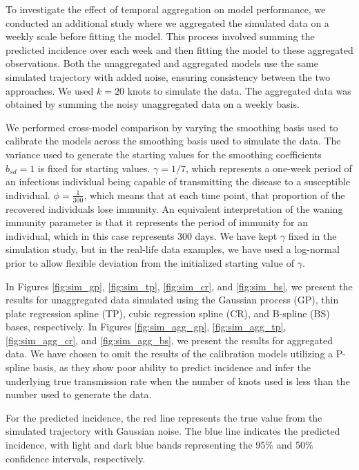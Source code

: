 \documentclass[
11pt, %
oneside, %
english, %
singlespacing, %
]{macthesis} %
\begin{document}
To investigate the effect of temporal aggregation on model performance, we conducted an additional study where we aggregated the simulated data on a weekly scale before fitting the model. This process involved summing the predicted incidence over each week and then fitting the model to these aggregated observations. Both the unaggregated and aggregated models use the same simulated trajectory with added noise, ensuring consistency between the two approaches. We used \(k=20\) knots to simulate the data. The aggregated data was obtained by summing the noisy unaggregated data on a weekly basis.

We performed cross-model comparison by varying the smoothing basis used to calibrate the models across the smoothing basis used to simulate the data. The variance used to generate the starting values for the smoothing coefficients \(b_{sd} = 1\) is fixed for starting values. \(\gamma = 1/7\), which represents a one-week period of an infectious individual being capable of transmitting the disease to a susceptible individual. \(\phi = \frac{1}{300}\), which means that at each time point, that proportion of the recovered individuals lose immunity. An equivalent interpretation of the waning immunity parameter is that it represents the period of immunity for an individual, which in this case represents 300 days. We have kept \(\gamma\) fixed in the simulation study, but in the real-life data examples, we have used a log-normal prior to allow flexible deviation from the initialized starting value of \(\gamma\).

In Figures \ref{fig:sim_gp}, \ref{fig:sim_tp}, \ref{fig:sim_cr}, and \ref{fig:sim_bs}, we present the results for unaggregated data simulated using the Gaussian process (GP), thin plate regression spline (TP), cubic regression spline (CR), and B-spline (BS) bases, respectively. In Figures \ref{fig:sim_agg_gp}, \ref{fig:sim_agg_tp}, \ref{fig:sim_agg_cr}, and \ref{fig:sim_agg_bs}, we present the results for aggregated data. We have chosen to omit the results of the calibration models utilizing a P-spline basis, as they show poor ability to predict incidence and infer the underlying true transmission rate when the number of knots used is less than the number used to generate the data.

For the predicted incidence, the red line represents the true value from the simulated trajectory with Gaussian noise. The blue line indicates the predicted incidence, with light and dark blue bands representing the 95\% and 50\% confidence intervals, respectively.
\end{document}
